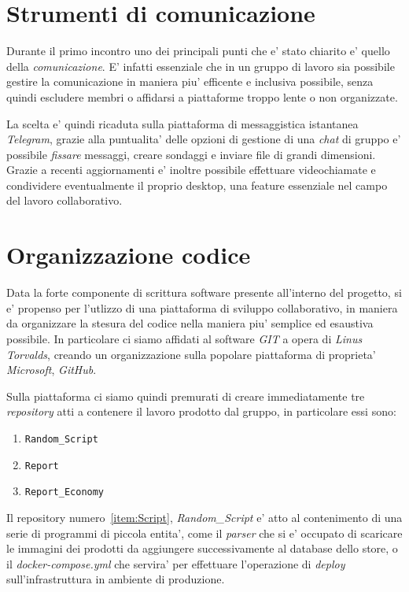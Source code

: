 \documentclass[a4paper]{report}
\begin{document}
	\section{Strumenti di comunicazione}\label{strumenti di comunicazione}
		Durante il primo incontro uno dei principali punti che e' stato chiarito e' quello della \emph{comunicazione}.
		E' infatti essenziale che in un gruppo di lavoro sia possibile gestire la comunicazione in maniera piu'
		efficente e inclusiva possibile, senza quindi escludere membri o affidarsi a piattaforme troppo lente o non
		organizzate.
		
		La scelta e' quindi ricaduta sulla piattaforma di messaggistica istantanea \emph{Telegram}, grazie alla
		puntualita' delle opzioni di gestione di una \emph{chat} di gruppo e' possibile \emph{fissare} messaggi, creare
		sondaggi e inviare file di grandi dimensioni. Grazie a recenti aggiornamenti e' inoltre possibile effettuare
		videochiamate e condividere eventualmente il proprio desktop, una feature essenziale nel campo del lavoro
		collaborativo.
	\section{Organizzazione codice}\label{organizzazione codice}
		Data la forte componente di scrittura software presente all'interno del progetto, si e' propenso per l'utlizzo
		di una piattaforma di sviluppo collaborativo, in maniera da organizzare la stesura del codice nella maniera piu'
		semplice ed esaustiva possibile. In particolare ci siamo affidati al software \emph{GIT} a opera di \emph{Linus
		Torvalds}, creando un organizzazione sulla popolare piattaforma di proprieta' \emph{Microsoft}, \emph{GitHub}.

		Sulla piattaforma ci siamo quindi premurati di creare immediatamente tre \emph{repository} atti a contenere il
		lavoro prodotto dal gruppo, in particolare essi sono:
		\begin{enumerate}
			\item \texttt{Random\_Script}\label{item:Script}
			\item \texttt{Report}\label{item:Report}
			\item \texttt{Report\_Economy}\label{item:ReportE}
		\end{enumerate}

		Il repository numero~\ref{item:Script}{, \emph{Random\_Script}} e' atto al contenimento di una serie di
		programmi di piccola entita', come il \emph{parser} che si e' occupato di scaricare le immagini dei prodotti da
		aggiungere successivamente al database dello store, o il \emph{docker-compose.yml} che servira' per effettuare l'operazione di \emph{deploy} sull'infrastruttura in ambiente di produzione.
\end{document}
